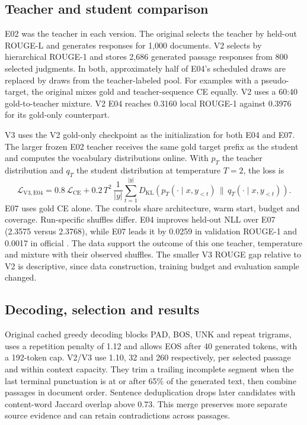 \subsection{Teacher and student comparison}
E02 was the teacher in each version. The original selects the teacher by
held-out ROUGE-L and generates responses for 1,000 documents. V2 selects
by hierarchical ROUGE-1 and stores 2,686 generated passage responses from
800 selected judgments. In both, approximately half of E04's scheduled draws
are replaced by draws from the teacher-labeled pool. For examples with a
pseudo-target, the original mixes gold and teacher-sequence CE equally.
V2 uses a 60:40 gold-to-teacher mixture. V2 E04 reaches 0.3160 local ROUGE-1
against 0.3976 for its gold-only counterpart.

V3 uses the V2 gold-only checkpoint as the initialization for both E04 and
E07. The larger frozen E02 teacher receives the same gold target prefix as
the student and computes the vocabulary distributions online. With
\(p_T\) the teacher distribution and \(q_T\) the student distribution at
temperature \(T=2\), the loss is
\[
  \mathcal L_{\mathrm{V3,E04}} =
  0.8\,\mathcal L_{\mathrm{CE}}+
  0.2\, T^2\,\frac{1}{|y|}\sum_{t=1}^{|y|}
  D_{\mathrm{KL}}\!\left(p_T(\cdot\mid x,y_{<t})
        \,\|\,q_T(\cdot\mid x,y_{<t})\right).
\]
E07 uses gold CE alone. The controls share architecture, warm start, budget
and coverage. Run-specific shuffles differ. E04 improves held-out NLL over
E07 (2.3575 versus 2.3768), while E07 leads it by 0.0259 in validation
ROUGE-1 and 0.0017 in official \BERT{}. The data support the outcome of this
one teacher, temperature and mixture with their observed shuffles. The
smaller V3 ROUGE gap relative to V2 is descriptive, since data construction,
training budget and evaluation sample changed.

\subsection{Decoding, selection and results}
Original cached greedy decoding blocks PAD, BOS, UNK and repeat trigrams,
uses a repetition penalty of 1.12 and allows EOS after 40 generated tokens,
with a 192-token cap. V2/V3 use 1.10, 32 and 260 respectively, per selected
passage and within context capacity. They trim a trailing incomplete segment
when the last terminal punctuation is at or after 65\% of the generated
text, then combine passages in document order. Sentence deduplication drops
later candidates with content-word Jaccard overlap above 0.73. This merge
preserves more separate source evidence and can retain contradictions across
passages.

